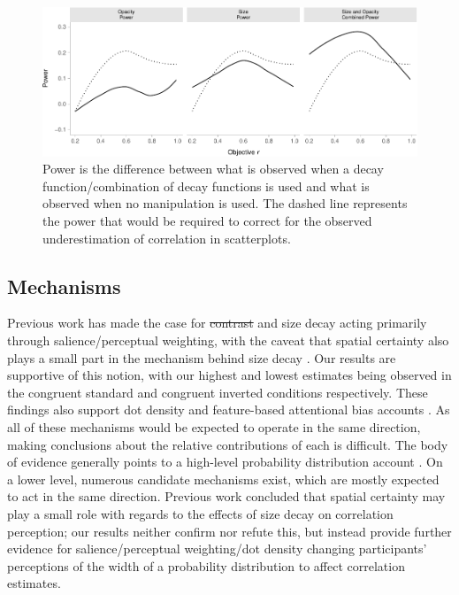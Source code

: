 \documentclass[manuscript, review, anonymous, screen]{acmart}
\providecommand{\DIFaddtex}[1]{{\protect\color{blue}\uwave{#1}}} %
\providecommand{\DIFdeltex}[1]{{\protect\color{red}\sout{#1}}}                      %
\providecommand{\DIFaddbegin}{} %
\providecommand{\DIFaddend}{} %
\providecommand{\DIFdelbegin}{} %
\providecommand{\DIFdelend}{} %
\providecommand{\DIFadd}[1]{\texorpdfstring{\DIFaddtex{#1}}{#1}} %
\providecommand{\DIFdel}[1]{\texorpdfstring{\DIFdeltex{#1}}{}} %
\newcommand{\DIFscaledelfig}{0.5}
\newlength{\DIFdelgraphicswidth} %
\newlength{\DIFdelgraphicsheight} %
\newcommand{\DIFaddincludegraphics}[2][]{{\color{blue}\fbox{\DIFOincludegraphics[#1]{#2}}}} %
\newcommand{\DIFdelincludegraphics}[2][]{%
\sbox{\DIFdelgraphicsbox}{\DIFOincludegraphics[#1]{#2}}%
\settoboxwidth{\DIFdelgraphicswidth}{\DIFdelgraphicsbox} %
\settoboxtotalheight{\DIFdelgraphicsheight}{\DIFdelgraphicsbox} %
\scalebox{\DIFscaledelfig}{%
\parbox[b]{\DIFdelgraphicswidth}{\usebox{\DIFdelgraphicsbox}\\[-\baselineskip] \rule{\DIFdelgraphicswidth}{0em}}\llap{\resizebox{\DIFdelgraphicswidth}{\DIFdelgraphicsheight}{%
\setlength{\unitlength}{\DIFdelgraphicswidth}%
\begin{picture}(1,1)%
\thicklines\linethickness{2pt} %
{\color[rgb]{1,0,0}\put(0,0){\framebox(1,1){}}}%
{\color[rgb]{1,0,0}\put(0,0){\line( 1,1){1}}}%
{\color[rgb]{1,0,0}\put(0,1){\line(1,-1){1}}}%
\end{picture}%
}\hspace*{3pt}}} %
} %
\DeclareRobustCommand{\DIFaddbegin}{\DIFOaddbegin \let\includegraphics\DIFaddincludegraphics} %
\DeclareRobustCommand{\DIFaddend}{\DIFOaddend \let\includegraphics\DIFOincludegraphics} %
\DeclareRobustCommand{\DIFdelbegin}{\DIFOdelbegin \let\includegraphics\DIFdelincludegraphics} %
\DeclareRobustCommand{\DIFdelend}{\DIFOaddend \let\includegraphics\DIFOincludegraphics} %
\begin{document}
\begin{figure}

{\centering \includegraphics[width=1\textwidth,height=\textheight]{size_and_opacity_files/figure-pdf/fig-power-plot-1.pdf}

}

\caption{\label{fig-power-plot}Power is the difference between what is
observed when a decay function/combination of decay functions is used
and what is observed when no manipulation is used. The dashed line
represents the power that would be required to correct for the observed
underestimation of correlation in scatterplots.}

\end{figure}

\hypertarget{sec-mechs}{%
\subsection{Mechanisms}\label{sec-mechs}}

Previous work has made the case for \DIFdelbegin \DIFdel{contrast }\DIFdelend \DIFaddbegin \DIFadd{opacity }\DIFaddend and size decay acting
primarily through salience/perceptual weighting, with the caveat that
spatial certainty also plays a small part in the mechanism behind size
decay \citep{strain_2023, strain_2023b}. Our results are supportive of
this notion, with our highest and lowest estimates being observed in the
congruent standard and congruent inverted conditions respectively. These
findings also support dot density \citep{yang_2023} and feature-based
attentional bias accounts \citep{hong_2021, sun_2016}. As all of these
mechanisms would be expected to operate in the same direction, making
conclusions about the relative contributions of each is difficult. The
body of evidence generally points to a high-level probability
distribution account \citep{rensink_2017, rensink_2022}. On a lower
level, numerous candidate mechanisms exist, which are mostly expected to
act in the same direction. Previous work concluded that spatial
certainty \citep{strain_2023b} may play a small role with regards to the
effects of size decay on correlation perception; our results neither
confirm nor refute this, but instead provide further evidence for
salience/perceptual weighting/dot density changing participants'
perceptions of the width of a probability distribution to affect
correlation estimates.
\end{document}
